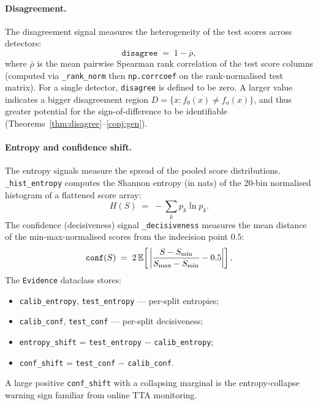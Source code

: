 \paragraph{Disagreement.}
The disagreement signal measures the heterogeneity of the test scores
across detectors:
\begin{equation}
  \texttt{disagree} \;=\; 1 - \overline{\rho},
  \label{eq:kga-disagree}
\end{equation}
where $\overline{\rho}$ is the mean pairwise Spearman rank correlation of the
test score columns (computed via \texttt{\_rank\_norm} then \texttt{np.corrcoef}
on the rank-normalised test matrix).  For a single detector, \texttt{disagree}
is defined to be zero.  A larger value indicates a bigger disagreement region
$D = \{x : f_0(x) \neq f_a(x)\}$, and thus greater potential for the
sign-of-difference to be identifiable
(Theorems~\ref{thm:disagree}--\ref{conj:gen}).

\paragraph{Entropy and confidence shift.}
The entropy signals measure the spread of the pooled score distributions.
\texttt{\_hist\_entropy} computes the Shannon entropy (in nats) of the
20-bin normalised histogram of a flattened score array:
\[
  H(S) \;=\; -\sum_k p_k \ln p_k.
\]
The confidence (decisiveness) signal \texttt{\_decisiveness} measures the mean
distance of the min-max-normalised scores from the indecision point $0.5$:
\[
  \texttt{conf}(S) \;=\; 2\,\mathbb{E}\!\left[\,\left|\frac{S - S_{\min}}{S_{\max} -
  S_{\min}} - 0.5\right|\right].
\]
The \texttt{Evidence} dataclass stores:
\begin{itemize}
  \item \texttt{calib\_entropy}, \texttt{test\_entropy} --- per-split entropies;
  \item \texttt{calib\_conf}, \texttt{test\_conf} --- per-split decisiveness;
  \item \texttt{entropy\_shift} = \texttt{test\_entropy} $-$
    \texttt{calib\_entropy};
  \item \texttt{conf\_shift} = \texttt{test\_conf} $-$ \texttt{calib\_conf}.
\end{itemize}
A large positive \texttt{conf\_shift} with a collapsing marginal is the
entropy-collapse warning sign familiar from online TTA monitoring.

